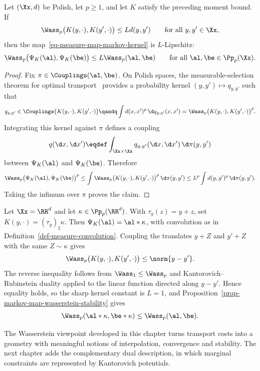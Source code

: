 \begin{prop}\label{prop-markov-map-wasserstein-stability}
	Let $(\Xx,d)$ be Polish, let $p\geq1$, and let $K$ satisfy the preceding moment bound. If
	\[
		\Wass_p\bigl(K(y,\cdot),K(y',\cdot)\bigr)
		\leq Ld(y,y')
		\qquad\text{for all }y,y'\in\Xx,
	\]
	then the map~\eqref{eq-measure-map-markov-kernel} is $L$-Lipschitz:
	\[
		\Wass_p\bigl(\Psi_K(\al),\Psi_K(\be)\bigr)
		\leq L\Wass_p(\al,\be)
		\qquad\text{for all }\al,\be\in\Pp_p(\Xx).
	\]
\end{prop}
\begin{proof}
	Fix $\pi\in\Couplings(\al,\be)$. On Polish spaces, the measurable-selection theorem for optimal transport~\cite{Villani09} provides a probability kernel $(y,y')\mapsto q_{y,y'}$ such that
	\[
		q_{y,y'}\in\Couplings\bigl(K(y,\cdot),K(y',\cdot)\bigr)
		\qandq
		\int d(x,x')^p\,\d q_{y,y'}(x,x')
		=
		\Wass_p\bigl(K(y,\cdot),K(y',\cdot)\bigr)^p.
	\]
	Integrating this kernel against $\pi$ defines a coupling
	\[
		q(\d x,\d x')
		\eqdef
		\int_{\Xx\times\Xx}
		q_{y,y'}(\d x,\d x')\,\d\pi(y,y')
	\]
	between $\Psi_K(\al)$ and $\Psi_K(\be)$. Therefore
	\[
		\Wass_p\bigl(\Psi_K(\al),\Psi_K(\be)\bigr)^p
		\leq
		\int\Wass_p\bigl(K(y,\cdot),K(y',\cdot)\bigr)^p\,\d\pi(y,y')
		\leq
		L^p\int d(y,y')^p\,\d\pi(y,y').
	\]
	Taking the infimum over $\pi$ proves the claim.
\end{proof}

\begin{example}\label{ex-convolution-wasserstein-nonexpansive}
	Let $\Xx=\RR^d$ and let $\kappa\in\Pp_p(\RR^d)$. With $\tau_y(z)=y+z$, set $K(y,\cdot)=(\tau_y)_\sharp\kappa$. Then $\Psi_K(\al)=\al*\kappa$, with convolution as in Definition~\ref{def-measure-convolution}. Coupling the translates $y+Z$ and $y'+Z$ with the same $Z\sim\kappa$ gives
	\[
		\Wass_p\bigl(K(y,\cdot),K(y',\cdot)\bigr)
		\leq\norm{y-y'}.
	\]
	The reverse inequality follows from $\Wass_1\leq\Wass_p$ and Kantorovich--Rubinstein duality applied to the linear function directed along $y-y'$. Hence equality holds, so the sharp kernel constant is $L=1$, and Proposition~\ref{prop-markov-map-wasserstein-stability} gives
	\[
		\Wass_p(\al*\kappa,\be*\kappa)\leq\Wass_p(\al,\be).
	\]
\end{example}


The Wasserstein viewpoint developed in this chapter turns transport costs into a geometry with meaningful notions of interpolation, convergence and stability. The next chapter adds the complementary dual description, in which marginal constraints are represented by Kantorovich potentials.
